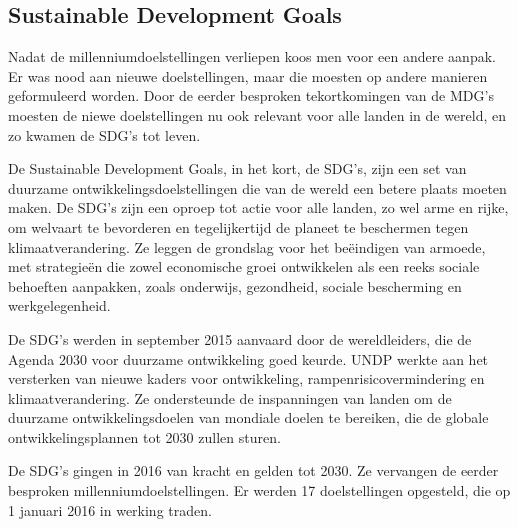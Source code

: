 \subsection{Sustainable Development Goals}
Nadat de millenniumdoelstellingen verliepen koos men voor een andere aanpak. Er was nood aan nieuwe doelstellingen, maar die moesten op andere manieren geformuleerd worden. Door de eerder besproken tekortkomingen van de MDG's moesten de niewe doelstellingen nu ook relevant voor alle landen in de wereld, en zo kwamen de SDG's tot leven.  \autocite{VN2015}

De Sustainable Development Goals, in het kort, de SDG's, zijn een set van duurzame ontwikkelingsdoelstellingen die van de wereld een betere plaats moeten maken. De SDG’s zijn een oproep tot actie voor alle landen, zo wel arme en rijke, om welvaart te bevorderen en tegelijkertijd de planeet te beschermen tegen klimaatverandering. Ze leggen de grondslag voor het beëindigen van armoede, met strategieën die zowel economische groei ontwikkelen als een reeks sociale behoeften aanpakken, zoals onderwijs, gezondheid, sociale bescherming en werkgelegenheid. \autocite{VerenigdeNaties2004}


De SDG's werden in september 2015 aanvaard door de wereldleiders, die de Agenda 2030 voor duurzame ontwikkeling goed keurde. UNDP werkte aan het versterken van nieuwe kaders voor ontwikkeling, rampenrisicovermindering en klimaatverandering. Ze ondersteunde de inspanningen van landen om de duurzame ontwikkelingsdoelen van mondiale doelen te bereiken, die de globale ontwikkelingsplannen tot 2030 zullen sturen.

De SDG's gingen in 2016 van kracht en gelden tot 2030. Ze vervangen de eerder besproken millenniumdoelstellingen. Er werden 17 doelstellingen opgesteld, die op 1 januari 2016 in werking traden. \autocite{DevelopmentProgram2020}
 
